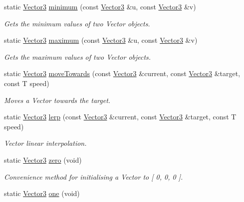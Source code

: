 \begin{DoxyCompactItemize}
static \hyperlink{classsparky_1_1_vector3}{Vector3} \hyperlink{classsparky_1_1_vector3_a075725658828d13e558bf3757624b75f}{minimum} (const \hyperlink{classsparky_1_1_vector3}{Vector3} \&u, const \hyperlink{classsparky_1_1_vector3}{Vector3} \&v)
\begin{DoxyCompactList}\small\item\em Gets the minimum values of two Vector objects. \end{DoxyCompactList}\item 
static \hyperlink{classsparky_1_1_vector3}{Vector3} \hyperlink{classsparky_1_1_vector3_a148b06f655c546df5c9054bb6b5e7efc}{maximum} (const \hyperlink{classsparky_1_1_vector3}{Vector3} \&u, const \hyperlink{classsparky_1_1_vector3}{Vector3} \&v)
\begin{DoxyCompactList}\small\item\em Gets the maximum values of two Vector objects. \end{DoxyCompactList}\item 
static \hyperlink{classsparky_1_1_vector3}{Vector3} \hyperlink{classsparky_1_1_vector3_ab4576aa88ad2d0ea27f1aa8cc39d07db}{move\+Towards} (const \hyperlink{classsparky_1_1_vector3}{Vector3} \&current, const \hyperlink{classsparky_1_1_vector3}{Vector3} \&target, const T speed)
\begin{DoxyCompactList}\small\item\em Moves a Vector towards the target. \end{DoxyCompactList}\item 
static \hyperlink{classsparky_1_1_vector3}{Vector3} \hyperlink{classsparky_1_1_vector3_a49aa5f5c7583093544b8fcdee684678c}{lerp} (const \hyperlink{classsparky_1_1_vector3}{Vector3} \&current, const \hyperlink{classsparky_1_1_vector3}{Vector3} \&target, const T speed)
\begin{DoxyCompactList}\small\item\em Vector linear interpolation. \end{DoxyCompactList}\item 
static \hyperlink{classsparky_1_1_vector3}{Vector3} \hyperlink{classsparky_1_1_vector3_accf83dce35ce0cd7aeeb865fe3e9e7a9}{zero} (void)
\begin{DoxyCompactList}\small\item\em Convenience method for initialising a Vector to \mbox{[} 0, 0, 0 \mbox{]}. \end{DoxyCompactList}\item 
static \hyperlink{classsparky_1_1_vector3}{Vector3} \hyperlink{classsparky_1_1_vector3_a4c14579a75db2a70f83868e4f45597a1}{one} (void)

\end{DoxyCompactItemize}

